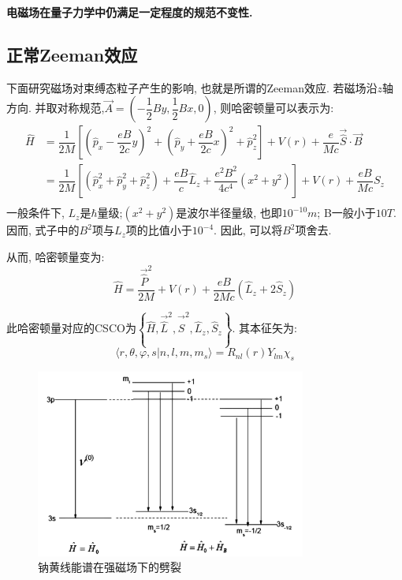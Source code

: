 \documentclass[a4paper, 11pt]{article}
\begin{document}
\begin{spacing}{1.2}
        \textbf{电磁场在量子力学中仍满足一定程度的规范不变性.}
        
      \subsection{正常Zeeman效应}
        下面研究磁场对束缚态粒子产生的影响, 也就是所谓的Zeeman效应.
        若磁场沿$z$轴方向. 并取对称规范,$\vec{A}=\left(-\dfrac{1}{2}By,\dfrac{1}{2}Bx, 0\right)$, 
        则哈密顿量可以表示为:
        \begin{equation}
          \begin{aligned}
            \hat{H} &= \dfrac{1}{2M}\left[\left(\hat{p}_x-\dfrac{eB}{2c}y\right)^2+\left(\hat{p}_y+\dfrac{eB}{2c}x\right)^2
            +\hat{p}_z^2\right]+V(r)+\dfrac{e}{Mc}\vec{\hat{S}}\cdot\vec{B} \\
            &=\dfrac{1}{2M}\left[\left(\hat{p}_x^2+\hat{p}_y^2+\hat{p}_z^2\right)+\dfrac{eB}{c}\hat{L}_z+
            \dfrac{e^2B^2}{4c^4}\left(x^2+y^2\right)\right]+V(r)+\dfrac{eB}{Mc}S_z \\
          \end{aligned}
        \end{equation}
        一般条件下, $L_z$是$\hbar$量级;$\left(x^2+y^2\right)$是波尔半径量级, 也即$10^{-10}m$; B一般小于$10T$.
        因而, 式子中的$B^2$项与$L_z$项的比值小于$10^{-4}$. 因此, 可以将$B^2$项舍去.

        从而, 哈密顿量变为:
        \begin{equation}
          \hat{H} = \dfrac{\vec{\hat{P}}^2}{2M}+V(r)+\dfrac{eB}{2Mc}\left(\hat{L}_z+2\hat{S}_z\right)
        \end{equation}

        此哈密顿量对应的CSCO为$\left\{\hat{H},\vec{\hat{L}}^2, \vec{\hat{S}}^2,\hat{L}_z, \hat{S}_z\right\}$.
        其本征矢为:
        \begin{equation}
          \langle{}r,\theta,\varphi,s|n,l,m,m_s\rangle = R_{nl}(r)Y_{lm}\chi_s
        \end{equation}

        \begin{figure}
          \centering\includegraphics[width=3.5in]{image/Na_jump}
          \caption{钠黄线能谱在强磁场下的劈裂}
        \end{figure}


\end{spacing}
\end{document}
